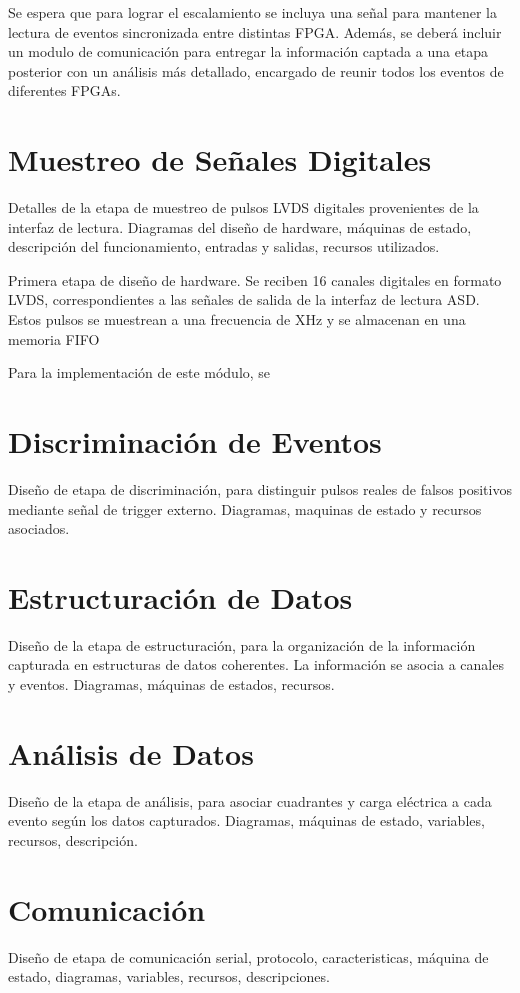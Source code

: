 Se espera que para lograr el escalamiento se incluya una señal para mantener la lectura de eventos sincronizada entre distintas FPGA. Además, se deberá incluir un modulo de comunicación para entregar la información captada a una etapa posterior con un análisis más detallado, encargado de reunir todos los eventos de diferentes FPGAs.

\section{Muestreo de Señales Digitales}
\label{sec:sampling}
Detalles de la etapa de muestreo de pulsos LVDS digitales provenientes de la interfaz de lectura. Diagramas del diseño de hardware, máquinas de estado, descripción del funcionamiento, entradas y salidas, recursos utilizados.

Primera etapa de diseño de hardware. Se reciben 16 canales digitales en formato LVDS, correspondientes a las señales de salida de la interfaz de lectura ASD. Estos pulsos se muestrean a una frecuencia de XHz y se almacenan en una memoria FIFO 

Para la implementación de este módulo, se 

\section{Discriminación de Eventos}
\label{sec:discriminator}
Diseño de etapa de discriminación, para distinguir pulsos reales de falsos positivos mediante señal de trigger externo. Diagramas, maquinas de estado y recursos asociados.

\section{Estructuración de Datos}
\label{sec:structure}
Diseño de la etapa de estructuración, para la organización de la información capturada en estructuras de datos coherentes. La información se asocia a canales y eventos. Diagramas, máquinas de estados, recursos.

\section{Análisis de Datos}
\label{sec:analysis}
Diseño de la etapa de análisis, para asociar cuadrantes y carga eléctrica a cada evento según los datos capturados. Diagramas, máquinas de estado, variables, recursos, descripción.




\section{Comunicación}
\label{sec:comm}
Diseño de etapa de comunicación serial, protocolo, caracteristicas, máquina de estado, diagramas, variables, recursos, descripciones.